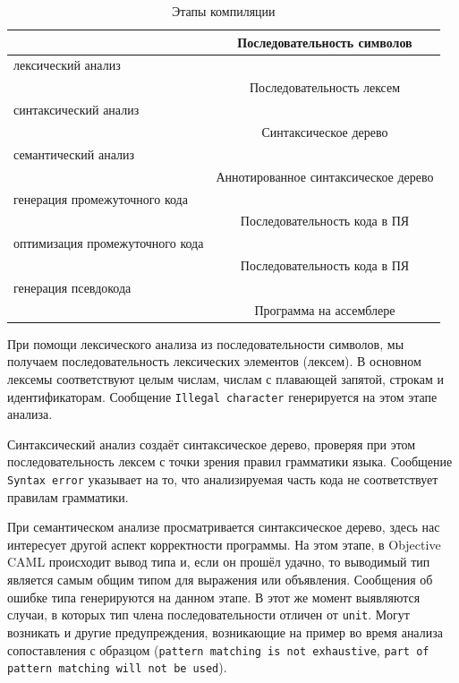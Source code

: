 \begin{table}[hc]
	\centering
	\caption{\label{tbl:compilation_stages}Этапы компиляции}
	\begin{tabular}{|l|c|}
	\hline
	 & Последовательность символов \\
	\hline
	лексический анализ & \\
	\hline
	 & Последовательность лексем \\
	\hline
	синтаксический анализ & \\
	\hline
	 & Синтаксическое дерево \\
	\hline
	семантический анализ & \\
	\hline
	 & Аннотированное синтаксическое дерево \\
	\hline
	генерация промежуточного кода & \\
	\hline
	 & Последовательность кода в ПЯ \\
	\hline
	оптимизация промежуточного кода & \\
	\hline
	& Последовательность кода в ПЯ \\
	\hline
	генерация псевдокода & \\
	\hline
	 & Программа на ассемблере\\
	\hline
	\end{tabular}
\end{table}

При помощи лексического анализа из последовательности символов, мы получаем
последовательность лексических элементов (лексем). В основном лексемы
соответствуют целым числам, числам с плавающей запятой, строкам и
идентификаторам. Сообщение \texttt{Illegal character} генерируется на этом
этапе анализа.

Синтаксический анализ создаёт синтаксическое дерево, проверяя при этом
последовательность лексем с точки зрения правил грамматики языка. Сообщение
\texttt{Syntax error} указывает на то, что анализируемая часть кода не
соответствует правилам грамматики.

При семантическом анализе просматривается синтаксическое дерево, здесь нас
интересует другой аспект корректности программы. На этом этапе, в Objective CAML
происходит вывод типа и, если он прошёл удачно, то выводимый тип является самым
общим типом для выражения или объявления. Сообщения об ошибке типа генерируются
на данном этапе. В этот же момент выявляются случаи, в которых тип члена
последовательности отличен от \texttt{unit}. Могут возникать и другие
предупреждения, возникающие на пример во время анализа сопоставления с образцом
(\texttt{pattern matching is not exhaustive}, \texttt{part of pattern matching
will not be used}).

